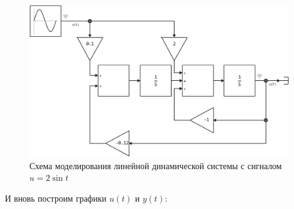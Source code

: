 \documentclass[a4paper]{article}
\begin{document}
\begin{figure}[H]
    \centering
    \includegraphics[height=0.23\textheight]{sources/task1_2sint_model.png}
    \caption*{Схема моделирования линейной динамической системы с сигналом $u=2\sin{t}$}
\end{figure}
И вновь построим графики $u(t)$ и $y(t)$:
\end{document}
